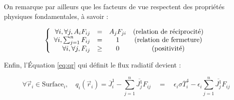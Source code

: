 On remarque par ailleurs que les facteurs de vue respectent des propriétés physiques fondamentales, à savoir :

\begin{equation}    
    \left\lbrace
    \begin{array}{r c c c  }
      \forall i ,\forall j, A_i F_{ij} & = & A_j F_{ji} & \text{(relation de réciprocité)}\\
      \forall i , \sum_{j = 1}^n F_{ij} & = & 1 & \text{(relation de fermeture)}\\ 
      \forall i ,\forall j, F_{ij} & \geq & 0 & \text{(positivité)}
    \end{array}\right.
    \label{eq:contraintes}
\end{equation}

Enfin, l'Équation \ref{eq:qr} qui définit le flux radiatif devient :

\begin{equation}
    \forall \vec{r}_i \in \text{Surface}_i,\quad q_i(\vec{r}_i) =  \overline{J}_i^1  -  \sum_{j=1}^{n} \overline{J_j^1} F_{ij} \quad = \quad \epsilon_i \sigma \overline{T}^4_i  - \epsilon_i \sum_{j=1}^{n} \overline{J_j^1} F_{ij}
    \label{eq:nice_qr}
\end{equation}
